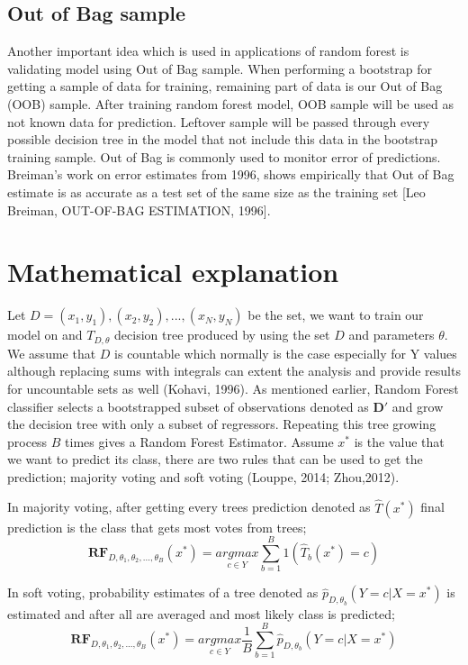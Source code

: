 \subsection {Out of Bag sample}
Another important idea which is used in applications of random forest is validating model using Out of Bag sample. When performing a bootstrap for getting a sample of data for training, remaining part of data is our Out of Bag (OOB) sample. After training random forest model, OOB sample will be used as not known data for prediction. Leftover sample will be passed through every possible decision tree in the model that not include this data in the bootstrap training sample. Out of Bag is commonly used to monitor error of predictions. Breiman’s work on error estimates from 1996, shows empirically that Out of Bag estimate is as accurate as a test set of the same size as the training set [Leo Breiman, OUT-OF-BAG ESTIMATION, 1996].


\section{Mathematical explanation}

Let $D = {(x_{1},y_{1}), (x_{2}, y_{2}), ... , (x_{N}, y_{N})}$ be the set, we want to train our model on and $T_{D, \theta}$ decision tree produced by using the set $D$ and parameters $\theta$. We assume that $D$ is countable which normally is the case especially for Y values although replacing sums with integrals can extent the analysis and provide results for uncountable sets as well (Kohavi, 1996). As mentioned earlier, Random Forest classifier selects a bootstrapped subset of observations denoted as $\boldsymbol{D'}$ and grow the decision tree with only a subset of regressors. Repeating this tree growing process $B$ times gives a Random Forest Estimator. Assume $x^*$ is the value that we want to predict its class, there are two rules that can be used to get the prediction; majority voting and soft voting (Louppe, 2014; Zhou,2012).

In majority voting, after getting every trees prediction denoted as $\hat{T}(x^*)$ final prediction is the class that gets most votes from trees;
\begin{equation}
\boldsymbol{RF}_{D, \theta_{1}, \theta_{2}, ..., \theta_{B}} (x^*) =
	\underset{c \in Y}{argmax} \sum_{b = 1}^{B}{1(\hat{T}_{b}(x^*) = c)}
\end{equation}


In soft voting, probability estimates of a tree denoted as $\hat{p}_{D, \theta_{b}} (Y = c | X = x^*)$ is estimated and after all are averaged and most likely class is predicted;
\begin{equation}
\boldsymbol{RF}_{D, \theta_{1}, \theta_{2}, ..., \theta_{B}} (x^*) =
	\underset{c \in Y}{argmax} \dfrac{1}{B}\sum_{b = 1}^{B}{\hat{p}_{D, \theta_{b}} (Y = c | X = x^*)}
\end{equation}



